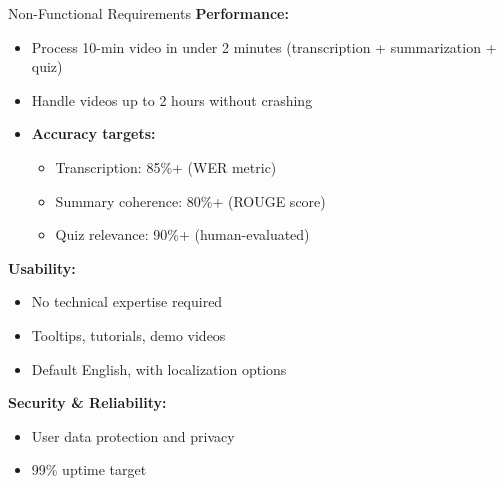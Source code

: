 \documentclass{beamer}
\begin{document}
\begin{frame}{Non-Functional Requirements}
    \textbf{Performance:}
    \begin{itemize}
        \item Process 10-min video in under 2 minutes (transcription + summarization + quiz)
        \item Handle videos up to 2 hours without crashing
        \item \textbf{Accuracy targets:}
            \begin{itemize}
                \item Transcription: 85\%+ (WER metric)
                \item Summary coherence: 80\%+ (ROUGE score)
                \item Quiz relevance: 90\%+ (human-evaluated)
            \end{itemize}
    \end{itemize}
    
    \textbf{Usability:}
    \begin{itemize}
        \item No technical expertise required
        \item Tooltips, tutorials, demo videos
        \item Default English, with localization options
    \end{itemize}
    
    \textbf{Security \& Reliability:}
    \begin{itemize}
        \item User data protection and privacy
        \item 99\% uptime target
    \end{itemize}
\end{frame}
\end{document}
